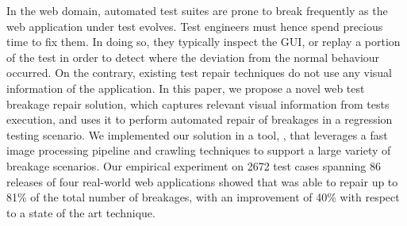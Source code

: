In the web domain, automated test suites are prone to break frequently as the web application under test evolves. Test engineers must hence spend precious time to fix them. In doing so, they typically inspect the GUI, or replay a portion of the test in order to detect where the deviation from the normal behaviour occurred. 
On the contrary, existing test repair techniques do not use any visual information of the application.
In this paper, we propose a novel web test breakage repair solution, which captures relevant visual information from tests execution, and uses it to perform automated repair of breakages in a regression testing scenario. We implemented our solution in a tool, \tool, that leverages a fast image processing pipeline and crawling techniques to support a large variety of breakage scenarios. Our empirical experiment on 2672 test cases spanning 86 releases of four real-world web applications showed that \tool was able to repair up to 81\% of the total number of breakages, with an improvement of 40\% with respect to a state of the art technique. %